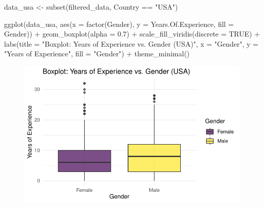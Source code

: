 \documentclass[
  letterpaper,
  DIV=11,
  numbers=noendperiod]{scrartcl}
\newenvironment{Shaded}{\begin{snugshade}}{\end{snugshade}}
\newcommand{\AttributeTok}[1]{\textcolor[rgb]{0.40,0.45,0.13}{#1}}
\newcommand{\ConstantTok}[1]{\textcolor[rgb]{0.56,0.35,0.01}{#1}}
\newcommand{\FloatTok}[1]{\textcolor[rgb]{0.68,0.00,0.00}{#1}}
\newcommand{\FunctionTok}[1]{\textcolor[rgb]{0.28,0.35,0.67}{#1}}
\newcommand{\NormalTok}[1]{\textcolor[rgb]{0.00,0.23,0.31}{#1}}
\newcommand{\OtherTok}[1]{\textcolor[rgb]{0.00,0.23,0.31}{#1}}
\newcommand{\SpecialCharTok}[1]{\textcolor[rgb]{0.37,0.37,0.37}{#1}}
\newcommand{\StringTok}[1]{\textcolor[rgb]{0.13,0.47,0.30}{#1}}
\begin{document}
\begin{Shaded}
\begin{Highlighting}[]
\NormalTok{data\_usa }\OtherTok{\textless{}{-}} \FunctionTok{subset}\NormalTok{(filtered\_data, Country }\SpecialCharTok{==} \StringTok{"USA"}\NormalTok{)}

\FunctionTok{ggplot}\NormalTok{(data\_usa, }\FunctionTok{aes}\NormalTok{(}\AttributeTok{x =} \FunctionTok{factor}\NormalTok{(Gender), }\AttributeTok{y =}\NormalTok{ Years.Of.Experience, }\AttributeTok{fill =}\NormalTok{ Gender)) }\SpecialCharTok{+}
  \FunctionTok{geom\_boxplot}\NormalTok{(}\AttributeTok{alpha =} \FloatTok{0.7}\NormalTok{) }\SpecialCharTok{+}
  \FunctionTok{scale\_fill\_viridis}\NormalTok{(}\AttributeTok{discrete =} \ConstantTok{TRUE}\NormalTok{) }\SpecialCharTok{+}
  \FunctionTok{labs}\NormalTok{(}\AttributeTok{title =} \StringTok{"Boxplot: Years of Experience vs. Gender (USA)"}\NormalTok{,}
       \AttributeTok{x =} \StringTok{"Gender"}\NormalTok{,}
       \AttributeTok{y =} \StringTok{"Years of Experience"}\NormalTok{,}
       \AttributeTok{fill =} \StringTok{"Gender"}\NormalTok{) }\SpecialCharTok{+}
  \FunctionTok{theme\_minimal}\NormalTok{()}
\end{Highlighting}
\end{Shaded}

\begin{figure}[H]

{\centering \includegraphics{main_doc_files/figure-pdf/unnamed-chunk-67-1.pdf}

}

\end{figure}
\end{document}
